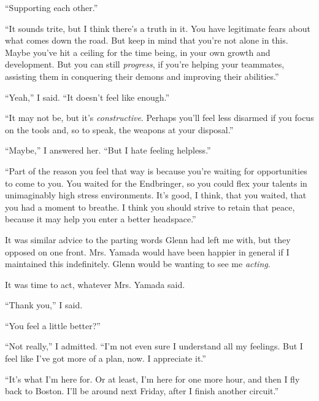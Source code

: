 ``Supporting each other.''



``It sounds trite, but I think there's a truth in it.  You have legitimate fears about what comes down the road.  But keep in mind that you're not alone in this.  Maybe you've hit a ceiling for the time being, in your own growth and development.  But you can still \emph{progress}, if you're helping your teammates, assisting them in conquering their demons and improving their abilities.''



``Yeah,'' I said.  ``It doesn't feel like enough.''



``It may not be, but it's \emph{constructive}.  Perhaps you'll feel less disarmed if you focus on the tools and, so to speak, the weapons at your disposal.''



``Maybe,'' I answered her.  ``But I hate feeling helpless.''



``Part of the reason you feel that way is because you're waiting for opportunities to come to you.  You waited for the Endbringer, so you could flex your talents in unimaginably high stress environments.  It's good, I think, that you waited, that you had a moment to breathe.  I think you should strive to retain that peace, because it may help you enter a better headspace.''



It was similar advice to the parting words Glenn had left me with, but they opposed on one front.  Mrs. Yamada would have been happier in general if I maintained this indefinitely.  Glenn would be wanting to see me \emph{acting}.



It was time to act, whatever Mrs. Yamada said.



``Thank you,'' I said.



``You feel a little better?''



``Not really,'' I admitted.  ``I'm not even sure I understand all my feelings.  But I feel like I've got more of a plan, now.  I appreciate it.''



``It's what I'm here for.  Or at least, I'm here for one more hour, and then I fly back to Boston.  I'll be around next Friday, after I finish another circuit.''



